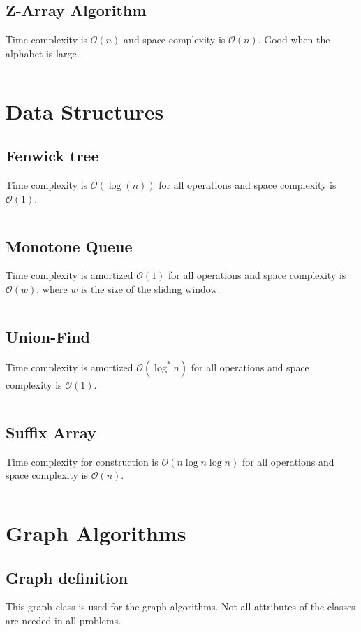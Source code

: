 \documentclass[8pt,a4paper,landscape,oneside]{amsart}
\newcommand{\code}[1]{\inputminted[fontsize=\normalsize,baselinestretch=1]{java}{code/#1}}
\newcommand{\bigO}{\mathcal{O}}
\begin{document}
\begin{multicols*}{3}
  \subsection{Z-Array Algorithm}
  Time complexity is $\bigO(n)$ and space complexity is $\bigO(n)$. Good when the alphabet is large.
  \code{Structures/ZArray.java}
  
  
\section{Data Structures}
  \subsection{Fenwick tree}
  Time complexity is $\bigO(\log(n))$ for all operations and space complexity is $\bigO(1)$.
  \code{Structures/Fenwick.java}
  
  \subsection{Monotone Queue}
  Time complexity is amortized $\bigO(1)$ for all operations and space complexity is $\bigO(w)$, where $w$ is the size of the sliding window.
  \code{Structures/MinMonoQueue.java}
  
  \subsection{Union-Find}
  Time complexity is amortized $\bigO(\log^*{n})$ for all operations and space complexity is $\bigO(1)$.
  \code{Structures/UnionFind.java}
  
  \subsection{Suffix Array}
  Time complexity for construction is $\bigO(n\log{n}\log{n})$ for all operations and space complexity is $\bigO(n)$.
  \code{Structures/SuffixArray.java}
  
  
\section{Graph Algorithms}
  \subsection{Graph definition}
  This graph class is used for the graph algorithms. Not all attributes of the classes are needed in all problems.
  \code{Graphs/Graph.java}  

\end{multicols*}
\end{document}
